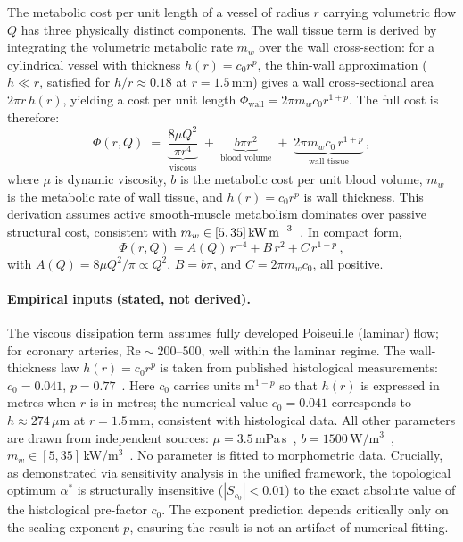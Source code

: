 \documentclass[11pt,a4paper]{article}
\theoremstyle{remark}
\begin{document}
The metabolic cost per unit length of a vessel of radius $r$ carrying
volumetric flow $Q$ has three physically distinct components. The wall
tissue term is derived by integrating the volumetric metabolic rate
$m_w$ over the wall cross-section: for a cylindrical vessel with
thickness $h(r) = c_0 r^p$, the thin-wall approximation ($h \ll r$,
satisfied for $h/r \approx 0.18$ at $r = 1.5\,\text{mm}$) gives a
wall cross-sectional area $2\pi r\,h(r)$, yielding a cost per unit
length $\Phi_{\mathrm{wall}} = 2\pi m_w c_0 r^{1+p}$. The full cost
is therefore:
\begin{equation}
  \Phi(r,Q) \;=\; \underbrace{\frac{8\mu Q^2}{\pi r^4}}_{\text{viscous}}
            \;+\; \underbrace{b\pi r^2}_{\text{blood volume}}
            \;+\; \underbrace{2\pi m_w c_0\, r^{1+p}}_{\text{wall tissue}}\,,
  \label{eq:phi}
\end{equation}
where $\mu$ is dynamic viscosity, $b$ is the metabolic cost per unit
blood volume, $m_w$ is the metabolic rate of wall tissue, and $h(r)=c_0 r^p$
is wall thickness. This derivation assumes active smooth-muscle metabolism
dominates over passive structural cost, consistent with $m_w \in [5,
35]\,\text{kW\,m}^{-3}$~\cite{Paul1980}.
In compact form,
\begin{equation}
  \Phi(r,Q) = A(Q)\,r^{-4} + B\,r^2 + C\,r^{1+p}\,,
  \label{eq:phi_compact}
\end{equation}
with $A(Q)=8\mu Q^2/\pi\propto Q^2$, $B=b\pi$, and $C=2\pi m_w c_0$,
all positive.

\paragraph{Empirical inputs (stated, not derived).}
The viscous dissipation term assumes fully developed Poiseuille (laminar) flow;
for coronary arteries, $\mathrm{Re}\sim200$--$500$, well within the laminar
regime.
The wall-thickness law $h(r)=c_0 r^p$ is taken from published histological
measurements: $c_0=0.041$, $p=0.77$~\cite{Rhodin1967,Nichols2011,
WolinskyGlagov1967}.
Here $c_0$ carries units $\mathrm{m}^{1-p}$ so that $h(r)$ is expressed in
metres when $r$ is in metres; the numerical value $c_0=0.041$ corresponds to
$h\approx274\,\mu\mathrm{m}$ at $r=1.5\,\mathrm{mm}$, consistent with
histological data.
All other parameters are drawn from independent sources:
$\mu=3.5$\,mPa\,s~\cite{Caro1978},
$b=1500$\,W/$\mathrm{m}^3$~\cite{Murray1926,Taber1998},
$m_w\in[5,35]$\,kW/$\mathrm{m}^3$~\cite{Paul1980}.
No parameter is fitted to morphometric data. Crucially, as demonstrated via
sensitivity analysis in the unified framework, the topological optimum
$\alpha^*$ is structurally insensitive ($|S_{c_0}| < 0.01$) to the exact
absolute value of the histological pre-factor $c_0$. The exponent prediction
depends critically only on the scaling exponent $p$, ensuring the result is not
an artifact of numerical fitting.
\end{document}
